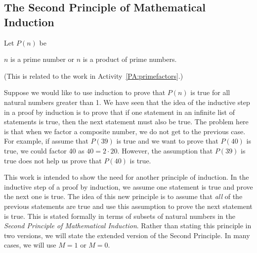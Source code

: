 \subsection*{The Second Principle of Mathematical Induction}
Let  $P( n )$ be 
\begin{center}
$n$  is a prime number or $n$ is a product of prime numbers.
\end{center}
(This is related to the work in \typeu Activity~\ref*{PA:primefactors}.)

Suppose we would like to use induction to prove that $P( n )$ is true for all natural numbers greater than 1.  We have seen that the idea of the inductive step in a proof by induction is to prove that if one statement in an infinite list of statements is true, then the next statement must also be true.  The problem here is that when we factor a composite number, we do not get to the previous case.  For example, if assume that $P(39)$ is true and we want to prove that $P(40)$ is true, we could factor 40 as $40 = 2 \cdot 20$.  However, the assumption that $P(39)$ is true does not help us prove that $P(40)$ is true.  %

This work is intended to show the need for another principle of induction.  In the inductive step of a proof by induction, we assume one statement is true and prove the next one is true.  The idea of this new principle is to assume that \emph{all} of the previous statements are true and use this assumption to prove the next statement is true.  This is stated formally in terms of subsets of natural numbers in the 
\emph{Second Principle of Mathematical Induction}.  Rather than stating this principle in two versions, we will state the extended version of the Second Principle.  In many cases, we will use  $M = 1$  or  $M = 0$.


\begin{center}
\end{center}
%
%
